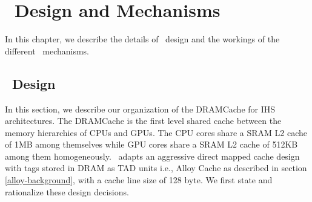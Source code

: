 \chapter{\cachename\ Design and Mechanisms} \label{chap:hashcache}
In this chapter, we describe the details of \cachename\ design and the workings of the different \cachename\ mechanisms.
\section{\cachename\ Design} \label{design}
In this section, we describe our organization of the DRAMCache for IHS architectures. The DRAMCache is the first level shared cache between the memory hierarchies of CPUs and GPUs. The CPU cores share a SRAM L2 cache of 1MB among themselves while GPU cores share a SRAM L2 cache of 512KB among them homogeneously. \cachename\ adapts an aggressive direct mapped cache design with tags stored in DRAM as TAD units i.e., Alloy Cache as described in section \ref{alloy-background}, with a cache line size of 128 byte. We first state and rationalize these design decisions.

